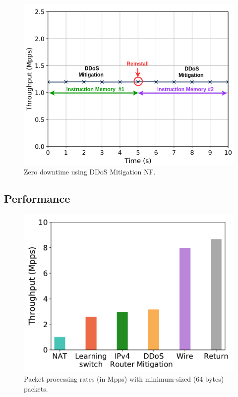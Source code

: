 
\begin{figure}[th]
\centering
\includegraphics[width=.75\linewidth]{figures/zero_downtime.png}
\caption{Zero downtime using DDoS Mitigation NF.}
\label{fig:zerodowntime}
\end{figure}

\subsection{Performance}
\label{sec:performance}

\begin{figure}[th]
\centering
\includegraphics[width=.85\linewidth]{figures/throughput_mpps_64B.pdf}
\caption{Packet processing rates (in Mpps) with minimum-sized (64 bytes) packets.}
\label{fig:throughput64}
\end{figure}

